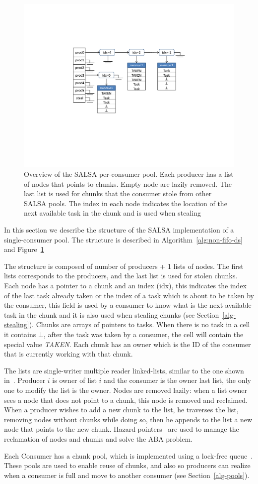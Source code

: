 

\begin{figure}[htb]
	\centering
	\includegraphics[height=0.3\textwidth]{figures/salsa-struct}
	\caption{
	    \footnotesize{Overview of the SALSA per-consumer pool. Each producer has a list of
nodes that points to chunks. Empty node are lazily removed. The last list is used for chunks that
the consumer stole from other SALSA pools. The index in each node indicates the location of the
next available task in the chunk and is used when stealing}}
	\label{fig:salsa-struct}
\end{figure}

In this section we describe the structure of the SALSA implementation of a single-consumer pool.
The structure is described in Algorithm~\ref{alg:non-fifo-ds} and Figure~\ref{fig:salsa-struct}

The structure is composed of number of producers + 1 lists of nodes. The first lists corresponds to
the producers, and the last list is used for stolen chunks. Each node has a pointer to a
chunk and an index (idx), this indicates the index of the last task already taken or the index of
a task which is about to be taken by the consumer, this field is used by a consumer to know what is
the next available task in the chunk and it is also used when stealing chunks (see
Section~\ref{alg-stealing}).
Chunks are arrays of pointers to tasks. When there is no task in a cell it contains $\bot$, after
the task was taken by a consumer, the cell will contain the special value \emph{TAKEN}. Each chunk
has an owner which is the ID of the consumer that is currently working with that chunk. 

The lists are single-writer multiple reader linked-lists, similar to the one shown
in~\cite{Michael:2004:HPS:987524.987595}. Producer $i$ is owner of list $i$ and the consumer is the
owner last list, the only one to modify the list is the owner. Nodes are removed lazily: when a list
owner sees a node that does not point to a chunk, this node is removed and reclaimed. When a
producer wishes to add a new chunk to the list, he traverses the list, removing nodes without chunks
while doing so, then he appends to the list a new node that points to the new chunk. Hazard
pointers~\cite{Michael:2004:HPS:987524.987595} are used to manage the reclamation of nodes and
chunks and solve the ABA problem. 

Each Consumer has a chunk pool, which is implemented using a
lock-free queue~\cite{Michael:1996:SFP:248052.248106}. These pools are used to enable reuse of
chunks, and also so producers can realize when a consumer is full and move to another consumer (see
Section~\ref{alg-pools}).
